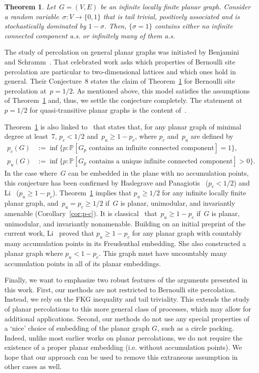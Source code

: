 \documentclass[11pt,letterpaper]{amsart}
\newcounter{n}
\newcounter{bigresults}
\numberwithin{n}{section}
\theoremstyle{plain}
\newtheorem{theorem}[bigresults]{Theorem}
\theoremstyle{definition}
\theoremstyle{remark}
\newcommand{\1}{\mathbbm{1}}
\begin{document}
\begin{theorem}\label{thm:perco}
	Let~$G=(V,E)$ be an infinite locally finite planar graph.
	Consider a random variable~$\sigma\colon V\to \{0,1\}$ that is tail trivial, positively associated and is stochastically dominated by $1-\sigma$.
	Then, $\{\sigma=1\}$ contains either no infinite connected component a.s. or infinitely many of them a.s.
\end{theorem}

The study of percolation on general planar graphs was initiated by Benjamini and Schramm~\cite{BenSch96}.
That celebrated work asks which properties of Bernoulli site percolation are particular to two-dimensional lattices and which ones hold in general.
Their Conjecture~$8$ states the claim of Theorem~\ref{thm:perco} for Bernoulli site percolation at~$p=1/2$.
As mentioned above, this model satisfies the assumptions of Theorem~\ref{thm:perco} and, thus, we settle the conjecture completely.
The statement at~$p=1/2$ for quasi-transitive planar graphs is the content of~\cite[Theorem~1.9]{GriLi25}. 


Theorem~\ref{thm:perco} is also linked to~\cite[Conjecture~$7$]{BenSch96} that states that, for any planar graph of minimal degree at least~$7$, $p_c<1/2$ and~$p_u\geq 1-p_c$, where $p_c$ and~$p_u$ are defined by
\begin{align*}
	p_c(G) &:= \inf \{ p : \mathbb{P}[G_p \text{ contains an infinite connected component}] =1\},\\
	p_u(G) &:= \inf \{ p : \mathbb{P}[G_p \text{ contains a unique infinite connected component}] > 0\}.
\end{align*}
In the case where~$G$ can be embedded in the plane with no accumulation points, this conjecture has been confirmed by Haslegrave and Panagiotis~\cite{HasPan21} ($p_c<1/2$) and Li~\cite{Li23} ($p_u\geq 1-p_c$).
Theorem~\ref{thm:perco} implies that $p_u \geq 1/2$ for any infinite locally finite planar graph, and~$p_u=p_c\geq 1/2$ if~$G$ is planar, unimodular, and invariantly amenable (Corollary~\ref{cor:p-c}). It is classical~\cite{BenSch01a} that~$p_u \geq 1 - p_c$ if~$G$ is planar, unimodular, and invariantly nonamenable. Building on an initial preprint of the current work, Li~\cite{Li26} proved that $p_u \geq 1 - p_c$ for any planar graph with countably many accumulation points in its Freudenthal embedding. She also constructed a planar graph where $p_u < 1 - p_c$. This graph must have uncountably many accumulation points in all of its planar embeddings.

Finally, we want to emphasize two robust features of the arguments presented in this work. 
First, our methods are not restricted to Bernoulli site percolation. Instead, we rely on the FKG inequality and tail triviality. This extends the study of planar percolations to this more general class of processes, which may allow for additional applications.
Second, our methods do not use any special properties of a `nice' choice of embedding of the planar graph $G$, such as a circle packing. Indeed, unlike most earlier works on planar percolations, we do not require the existence of a proper planar embedding (i.e. without accumulation points). We hope that our approach can be used to remove this extraneous assumption in other cases as well.
\end{document}
